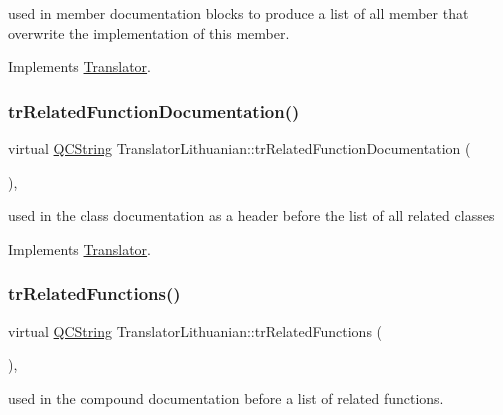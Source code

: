 used in member documentation blocks to produce a list of all member that overwrite the implementation of this member. 

Implements \mbox{\hyperlink{class_translator}{Translator}}.

\mbox{\label{class_translator_lithuanian_a727b427bf29a44716a51ac8121582722}} 
\subsubsection{\texorpdfstring{trRelatedFunctionDocumentation()}{trRelatedFunctionDocumentation()}}
{\footnotesize\ttfamily virtual \mbox{\hyperlink{class_q_c_string}{Q\+C\+String}} Translator\+Lithuanian\+::tr\+Related\+Function\+Documentation (\begin{DoxyParamCaption}{ }\end{DoxyParamCaption})\hspace{0.3cm}{\ttfamily [inline]}, {\ttfamily [virtual]}}

used in the class documentation as a header before the list of all related classes 

Implements \mbox{\hyperlink{class_translator}{Translator}}.

\mbox{\label{class_translator_lithuanian_a7b51b628c524e4caf2526353056b90c2}} 
\subsubsection{\texorpdfstring{trRelatedFunctions()}{trRelatedFunctions()}}
{\footnotesize\ttfamily virtual \mbox{\hyperlink{class_q_c_string}{Q\+C\+String}} Translator\+Lithuanian\+::tr\+Related\+Functions (\begin{DoxyParamCaption}{ }\end{DoxyParamCaption})\hspace{0.3cm}{\ttfamily [inline]}, {\ttfamily [virtual]}}

used in the compound documentation before a list of related functions. 


